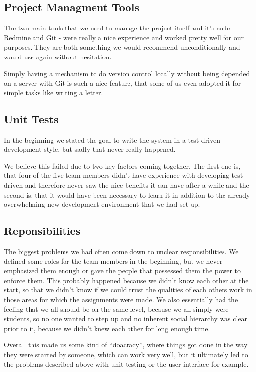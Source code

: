 \subsection{Project Managment Tools}

The two main tools that we used to manage the project itself and it's code - Redmine and Git - were really a nice experience and worked pretty well for our purposes. They are both something we would recommend unconditionally and would use again without hesitation. 

Simply having a mechanism to do version control locally without being depended on a server with Git is such a nice feature, that some of us even adopted it for simple tasks like writing a letter.

\subsection{Unit Tests}

In the beginning we stated the goal to write the system in a test-driven development style, but sadly that never really happened. 

We believe this failed due to two key factors coming together. The first one is, that four of the five team members didn't have experience with developing test-driven and therefore never saw the nice benefits it can have after a while and the second is, that it would have been necessary to learn it in addition to the already overwhelming new development environment that we had set up.

\subsection{Reponsibilities}

The biggest problems we had often come down to unclear responsibilities. We defined some roles for the team members in the beginning, but we never emphasized them enough or gave the people that possessed them the power to enforce them. This probably happened because we didn't know each other at the start, so that we didn't know if we could trust the qualities of each others work in those areas for which the assignments were made. We also essentially had the feeling that we all should be on the same level, because we all simply were students, so no one wanted to step up and no inherent social hierarchy was clear prior to it, because we didn't knew each other for long enough time.

Overall this made us some kind of \enquote{doacracy}, where things got done in the way they were started by someone, which can work very well, but it ultimately led to the problems described above with unit testing or the user interface for example.

